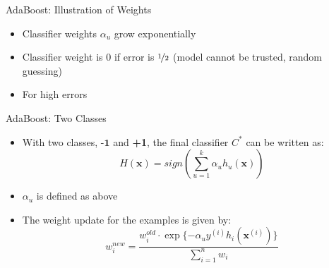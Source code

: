 \begin{frame}{AdaBoost: Illustration of Weights}{}\optional
	\vspace*{2mm}
	
	\footnotesize
	\begin{itemize}
		\item Classifier weights $\alpha_u$ grow exponentially
		\item Classifier weight is 0 if error is $\nicefrac{1}{2}$ (model cannot be trusted, random guessing)
		\item For high errors 
	\end{itemize}
\end{frame}


\begin{frame}{AdaBoost: Two Classes}{}
	\begin{itemize}
		\item With two classes, $\textbf{-1}$ and \textbf{+1}, the final classifier $C^*$ can be written as:
		\begin{equation}
			H(\bm{x}) = sign \left( \sum_{u=1}^k \alpha_u h_u(\bm{x}) \right)
		\end{equation}
		\item $\alpha_u$ is defined as above
		\item The weight update for the examples is given by:
		\begin{equation}
			w_i^{new} = \frac{w_i^{old} \cdot \exp \{ -\alpha_u y^{(i)} h_i(\bm{x}^{(i)}) \}}{\sum_{i=1}^n w_i}
		\end{equation}
	\end{itemize}
\end{frame}


